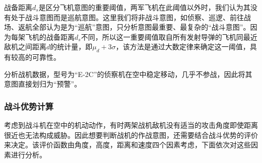 \documentclass{my_paper}
\begin{document}
战备距离$d_s$是区分飞机意图的重要阈值，两军飞机在此阈值以外时，我们认为其没有处于战斗意图而是巡航意图。这里我们将非战斗意图，如侦察、巡逻、前往战场、返航全部认为是为“巡航”意图，只分析意图最重要、最复杂的“战斗意图”。因为每架飞机的战备距离$d_s$不同，所以这一重要阈值取自所有发射导弹的飞机同最近敌机之间距离$d$的统计量，即$\mu_d + 3\sigma$，该方法是通过大数定律来确定这一阈值，具有较高的可靠性。

分析战机数据，型号为“E-2C”的侦察机在空中稳定移动，几乎不参战，因此将其意图直接划归为“预警”。

\subsubsection{战斗优势计算}

考虑到战斗机在空中的机动动作，有时两架战机敌机没有适当的攻击角度即使距离很近也无法构成威胁。因此想要判断战机的作战意图，还需要结合战斗优势的评价来决定。该评价函数由角度，高度，距离和速度四个因素考虑，下面依次对这些因素进行分析。
\end{document}

